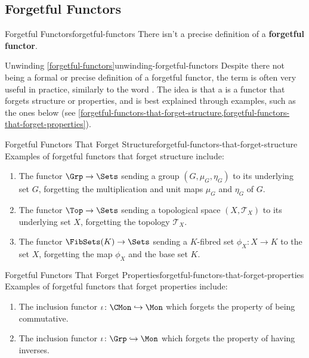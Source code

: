 \subsection{Forgetful Functors}\label{subsection-forgetful-functors}
\begin{definition}{Forgetful Functors}{forgetful-functors}%
    There isn't a precise definition of a \textbf{forgetful functor}.
\end{definition}
\begin{remark}{Unwinding \cref{forgetful-functors}}{unwinding-forgetful-functors}%
    Despite there not being a formal or precise definition of a forgetful functor, the term is often very useful in practice, similarly to the word . The idea is that a  is a functor that forgets structure or properties, and is best explained through examples, such as the ones below (see \cref{forgetful-functors-that-forget-structure,forgetful-functors-that-forget-properties}).
\end{remark}
\begin{example}{Forgetful Functors That Forget Structure}{forgetful-functors-that-forget-structure}%
    Examples of forgetful functors that forget structure include:
    \begin{enumerate}
        \item\label{forgetful-functors-that-forget-structure-forgetting-group-structures}The functor $\Grp\to\Sets$ sending a group $(G,\mu_{G},\eta_{G})$ to its underlying set $G$, forgetting the multiplication and unit maps $\mu_{G}$ and $\eta_{G}$ of $G$.
        \item\label{forgetful-functors-that-forget-structure-forgetting-topologies}The functor $\Top\to\Sets$ sending a topological space $(X,\mathcal{T}_{X})$ to its underlying set $X$, forgetting the topology $\mathcal{T}_{X}$.
        \item\label{forgetful-functors-that-forget-structure-forgetting-fibrations}The functor $\FibSets(K)\to\Sets$ sending a $K$-fibred set $\phi_{X}\colon X\to K$ to the set $X$, forgetting the map $\phi_{X}$ and the base set $K$.
    \end{enumerate}
\end{example}
\begin{example}{Forgetful Functors That Forget Properties}{forgetful-functors-that-forget-properties}%
    Examples of forgetful functors that forget properties include:
    \begin{enumerate}
        \item\label{forgetful-functors-that-forget-properties-forgetting-commutativity}The inclusion functor $\iota\colon\CMon\hookrightarrow\Mon$ which forgets the property of being commutative.
        \item\label{forgetful-functors-that-forget-properties-forgetting-inverses}The inclusion functor $\iota\colon\Grp\hookrightarrow\Mon$ which forgets the property of having inverses.
    \end{enumerate}
\end{example}
